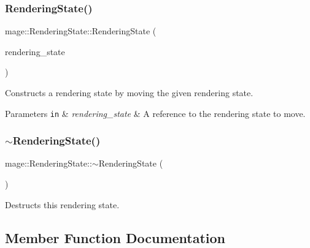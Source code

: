 \subsubsection{\texorpdfstring{Rendering\+State()}{RenderingState()}\hspace{0.1cm}{\footnotesize\ttfamily [4/4]}}
{\footnotesize\ttfamily mage\+::\+Rendering\+State\+::\+Rendering\+State (\begin{DoxyParamCaption}\item[{\hyperlink{structmage_1_1_rendering_state}{Rendering\+State} \&\&}]{rendering\+\_\+state }\end{DoxyParamCaption})\hspace{0.3cm}{\ttfamily [default]}}

Constructs a rendering state by moving the given rendering state.


\begin{DoxyParams}[1]{Parameters}
\mbox{\tt in}  & {\em rendering\+\_\+state} & A reference to the rendering state to move. \\
\hline
\end{DoxyParams}
\hypertarget{structmage_1_1_rendering_state_aaf45726193df68d65acffbbbf699cfa3}{}\label{structmage_1_1_rendering_state_aaf45726193df68d65acffbbbf699cfa3} 
\subsubsection{\texorpdfstring{$\sim$\+Rendering\+State()}{~RenderingState()}}
{\footnotesize\ttfamily mage\+::\+Rendering\+State\+::$\sim$\+Rendering\+State (\begin{DoxyParamCaption}{ }\end{DoxyParamCaption})\hspace{0.3cm}{\ttfamily [default]}}

Destructs this rendering state. 

\subsection{Member Function Documentation}
\hypertarget{structmage_1_1_rendering_state_ac1a0e8f7ba3865eaf0ec8445664a6a43}{}\label{structmage_1_1_rendering_state_ac1a0e8f7ba3865eaf0ec8445664a6a43} 
